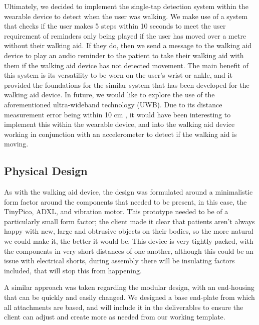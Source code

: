                    Ultimately, we decided to implement the single-tap detection system within the wearable device to detect when the user was walking. We make use of a system that checks if the user makes 5 steps within 10 seconds to meet the user requirement of reminders only being played if the user has moved over a metre without their walking aid. If they do, then we send a message to the walking aid device to play an audio reminder to the patient to take their walking aid with them if the walking aid device has not detected movement. The main benefit of this system is its versatility to be worn on the user's wrist or ankle, and it provided the foundations for the similar system that has been developed for the walking aid device. In future, we would like to explore the use of the aforementioned ultra-wideband technology (UWB). Due to its distance measurement error being within 10 cm \cite{uwb_accuracy}, it would have been interesting to implement this within the wearable device, and into the walking aid device working in conjunction with an accelerometer to detect if the walking aid is moving.
        
                \subsection{Physical Design}
                \label{subsec:Design_Decisions_wearable}
        
                    As with the walking aid device, the design was formulated around a minimalistic form factor around the components that needed to be present, in this case, the TinyPico, ADXL, and vibration motor. This prototype needed to be of a particularly small form factor; the client made it clear that patients aren't always happy with new, large and obtrusive objects on their bodies, so the more natural we could make it, the better it would be. This device is very tightly packed, with the components in very short distances of one another, although this could be an issue with electrical shorts, during assembly there will be insulating factors included, that will stop this from happening.
        
        
                    A similar approach was taken regarding the modular design, with an end-housing that can be quickly and easily changed. We designed a base end-plate from which all attachments are based, and will include it in the deliverables to ensure the client can adjust and create more as needed from our working template.
        
